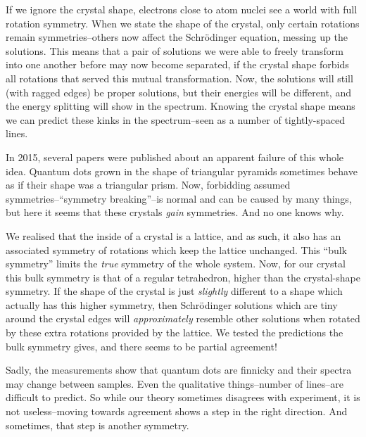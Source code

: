 If we ignore the crystal shape, electrons close to atom nuclei see a world with full rotation symmetry. When we state the shape of the crystal, only certain rotations remain symmetries--others now affect the Schrödinger equation, messing up the solutions. This means that a pair of solutions we were able to freely transform into one another before may now become separated, if the crystal shape forbids all rotations that served this mutual transformation. Now, the solutions will still (with ragged edges) be proper solutions, but their energies will be different, and the energy splitting will show in the spectrum. Knowing the crystal shape means we can predict these kinks in the spectrum--seen as a number of tightly-spaced lines.

In 2015, several papers were published about an apparent failure of this whole idea. Quantum dots grown in the shape of triangular pyramids sometimes behave as if their shape was a triangular prism. Now, forbidding assumed symmetries--``symmetry breaking''--is normal and can be caused by many things, but here it seems that these crystals \textit{gain} symmetries. And no one knows why.

We realised that the inside of a crystal is a lattice, and as such, it also has an associated symmetry of rotations which keep the lattice unchanged. This ``bulk symmetry'' limits the \textit{true} symmetry of the whole system. Now, for our crystal this bulk symmetry is that of a regular tetrahedron, higher than the crystal-shape symmetry. If the shape of the crystal is just \textit{slightly} different to a shape which actually has this higher symmetry, then Schrödinger solutions which are tiny around the crystal edges will \textit{approximately} resemble other solutions when rotated by these extra rotations provided by the lattice. We tested the predictions the bulk symmetry gives, and there seems to be partial agreement!

Sadly, the measurements show that quantum dots are finnicky and their spectra may change between samples. Even the qualitative things--number of lines--are difficult to predict. So while our theory sometimes disagrees with experiment, it is not useless--moving towards agreement shows a step in the right direction. And sometimes, that step is another symmetry.

\restoregeometry